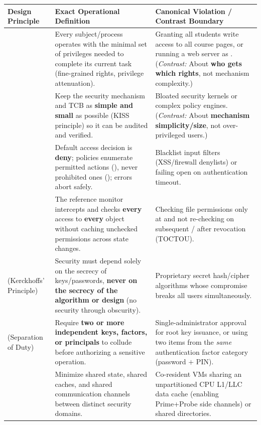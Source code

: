 \begin{table}[h!]
\centering
\footnotesize
\begin{tabularx}{\textwidth}{@{}L{3.1cm} Y Y@{}}
\toprule
\textbf{Design Principle} & \textbf{Exact Operational Definition} & \textbf{Canonical Violation / Contrast Boundary} \\
\midrule
{} & Every subject/process operates with the minimal set of privileges needed to complete its current task (fine-grained rights, privilege attenuation). & Granting all students write access to all course pages, or running a web server as . (\emph{Contrast:} About \textbf{who gets which rights}, not mechanism complexity.) \\
 & Keep the security mechanism and TCB as \textbf{simple and small} as possible (KISS principle) so it can be audited and verified. & Bloated security kernels or complex policy engines. (\emph{Contrast:} About \textbf{mechanism simplicity/size}, not over-privileged users.) \\
 & Default access decision is \textbf{deny}; policies enumerate permitted actions (), never prohibited ones (); errors abort safely. & Blacklist input filters (XSS/firewall denylists) or failing open on authentication timeout. \\
 & The reference monitor intercepts and checks \textbf{every} access to \textbf{every} object without caching unchecked permissions across state changes. & Checking file permissions only at  and not re-checking on subsequent / after revocation (TOCTOU). \\
 (Kerckhoffs' Principle) & Security must depend solely on the secrecy of keys/passwords, \textbf{never on the secrecy of the algorithm or design} (no security through obscurity). & Proprietary secret hash/cipher algorithms whose compromise breaks all users simultaneously. \\
 (Separation of Duty) & Require \textbf{two or more independent keys, factors, or principals} to collude before authorizing a sensitive operation. & Single-administrator approval for root key issuance, or using two items from the \emph{same} authentication factor category (password $+$ PIN). \\
 & Minimize shared state, shared caches, and shared communication channels between distinct security domains. & Co-resident VMs sharing an unpartitioned CPU L1/LLC data cache (enabling Prime+Probe side channels) or shared  directories. \\

\end{tabularx}
\end{table}
